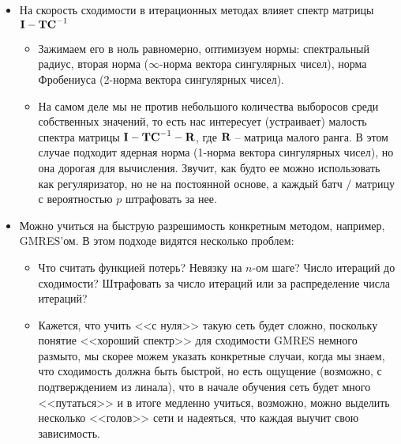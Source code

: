 \documentclass[a4paper, 12pt]{article}
\begin{document}
\begin{itemize}
    \item На скорость сходимости в итерационных методах
        влияет спектр матрицы $\textbf I - \textbf T\textbf C^{-1}$
        \begin{itemize}
            \item Зажимаем его в ноль равномерно,
                оптимизуем нормы: спектральный радиус,
                вторая норма ($\infty$-норма вектора
                сингулярных чисел), норма Фробениуса (2-норма вектора 
                сингулярных чисел).
            \item На самом деле мы не против небольшого количества
                выборосов среди собственных значений, то есть
                нас интересует (устраивает) малость спектра матрицы
                $\textbf I - \textbf T\textbf C^{-1} - \textbf R$, где
                $\textbf R$ -- матрица малого ранга. 
                В этом случае подходит ядерная норма (1-норма вектора
                сингулярных чисел), но она дорогая для
                вычисления. Звучит, как будто ее можно использовать
                как регуляризатор, но не на постоянной основе, а каждый
                батч / матрицу с вероятностью $p$ штрафовать за нее.
        \end{itemize}
    \item Можно учиться на быструю разрешимость конкретным
        методом, например, GMRES'ом. В этом подходе видятся 
        несколько проблем:
        \begin{itemize}
            \item Что считать функцией потерь?
                Невязку на $n$-ом шаге? Число итераций до сходимости?
                Штрафовать за число итераций или за распределение
                числа итераций?
            \item Кажется, что учить <<с нуля>> такую сеть
                будет сложно, поскольку понятие <<хороший спектр>>
                для сходимости GMRES немного размыто, мы скорее
                можем указать конкретные случаи, когда
                мы знаем, что сходимость должна быть быстрой, но
                есть ощущение (возможно, с подтверждением из линала), 
                что в начале обучения сеть будет
                много <<путаться>> и в итоге медленно учиться,
                возможно, можно выделить несколько <<голов>> сети
                и надеяться, что каждая выучит свою зависимость.
        \end{itemize}
\end{itemize}
\end{document}
